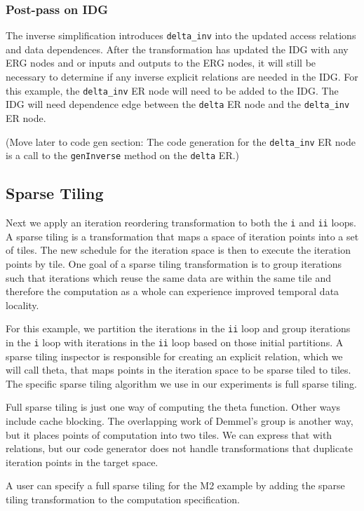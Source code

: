 \documentclass{article}
\begin{document}
\subsubsection{Post-pass on IDG}

The inverse simplification introduces {\tt delta\_inv} into the updated access relations and data dependences.
After the transformation has updated the IDG with any ERG nodes and or inputs and outputs to the ERG nodes, it will still be necessary to determine if any inverse explicit relations are needed in the IDG.
For this example, the {\tt delta\_inv} ER node will need to be added to the IDG.
The IDG will need dependence
edge between the {\tt delta} ER node and the {\tt delta\_inv} ER node. 

(Move later to code gen section: The code
generation for the {\tt delta\_inv} ER node is a call to the {\tt genInverse} method on the {\tt delta} ER.)

\subsection{Sparse Tiling}
Next we apply an iteration reordering transformation to both the {\tt i} and  {\tt ii} loops.
A sparse tiling is a transformation that maps a space of iteration points into a set of tiles.
The new schedule for the iteration space is then to execute the iteration points by tile.
One goal of a sparse tiling transformation is to group iterations such that iterations which reuse
the same data are within the same tile and therefore the computation as a whole can experience
improved temporal data locality.

For this example, we partition the iterations in the {\tt ii} loop and group iterations in 
the {\tt i} loop
with iterations in the {\tt ii} loop based on those initial partitions.
A sparse tiling inspector is responsible for creating an explicit relation, which we will call theta, 
that maps points
in the iteration space to be sparse tiled to tiles.
The specific sparse tiling algorithm we use in our experiments is full sparse tiling.

Full sparse tiling is just one way of computing the theta function.  Other ways include cache blocking.
The overlapping work of Demmel's group is another way, but it places points of computation into
two tiles.  We can express that with relations, but our code generator does not handle transformations
that duplicate iteration points in the target space.

A user can specify a full sparse tiling for the M2 example by adding the sparse tiling transformation
to the computation specification.
\end{document}
